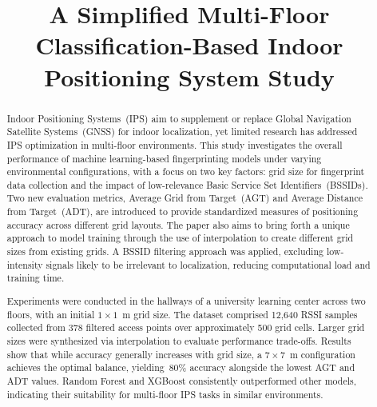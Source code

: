 \documentclass[runningheads]{llncs}
\begin{document}
%
\title{A Simplified Multi-Floor Classification-Based Indoor Positioning System Study}
%

%
\maketitle              %
%
\begin{abstract}
Indoor Positioning Systems~(IPS) aim to supplement or replace Global Navigation Satellite Systems~(GNSS) for indoor localization, yet limited research has addressed IPS optimization in multi-floor environments. This study investigates the overall performance of machine learning-based fingerprinting models under varying environmental configurations, with a focus on two key factors: grid size for fingerprint data collection and the impact of low-relevance Basic Service Set Identifiers~(BSSIDs). Two new evaluation metrics, Average Grid from Target~(AGT) and Average Distance from Target~(ADT), are introduced to provide standardized measures of positioning accuracy across different grid layouts. The paper also aims to bring forth a unique approach to model training through the use of interpolation to create different grid sizes from existing grids. A BSSID filtering approach was applied, excluding low-intensity signals likely to be irrelevant to localization, reducing computational load and training time.
 
Experiments were conducted in the hallways of a university learning center across two floors, with an initial $1\times1$~m grid size. The dataset comprised 12,640 RSSI samples collected from 378 filtered access points over approximately 500 grid cells. Larger grid sizes were synthesized via interpolation to evaluate performance trade-offs. Results show that while accuracy generally increases with grid size, a $7\times7$~m configuration achieves the optimal balance, yielding~80\% accuracy alongside the lowest AGT and ADT values. Random Forest and XGBoost consistently outperformed other models, indicating their suitability for multi-floor IPS tasks in similar environments.
\end{abstract}
\end{document}
